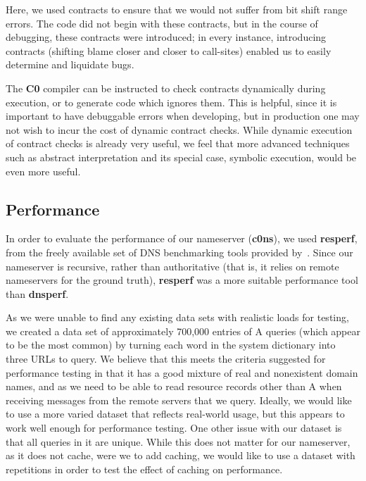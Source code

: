 \documentclass{article}
\newcommand\Kwd[1]{{\sffamily\bfseries{#1}}}
\begin{document}
Here, we used contracts to ensure that we would not suffer from bit
shift range errors. The code did not begin with these contracts, but
in the course of debugging, these contracts were introduced; in every
instance, introducing contracts (shifting blame closer and closer to
call-sites) enabled us to easily determine and liquidate bugs.

The \Kwd{C0} compiler can be instructed to check contracts dynamically
during execution, or to generate code which ignores them. This is
helpful, since it is important to have debuggable errors when
developing, but in production one may not wish to incur the cost of
dynamic contract checks. While dynamic execution of contract checks
is already very useful, we feel that more advanced techniques such as
abstract interpretation and its special case, symbolic execution,
would be even more useful.

\subsection{Performance}\label{sec:performance}

In order to evaluate the performance of our nameserver (\Kwd{c0ns}), we used \Kwd{resperf}, from the freely available set of DNS benchmarking tools provided by~\cite{github:dnsperf2}. Since our nameserver is recursive, rather than authoritative (that is, it relies on remote nameservers for the ground truth), \Kwd{resperf} was a more suitable performance tool than \Kwd{dnsperf}.

As we were unable to find any existing data sets with realistic loads for testing, we created a data set of approximately 700,000 entries of A queries (which appear to be the most common) by turning each word in the system dictionary into three URLs to query. We believe that this meets the criteria suggested for performance testing in that it has a good mixture of real and nonexistent domain names, and as we need to be able to read resource records other than A when receiving messages from the remote servers that we query. Ideally, we would like to use a more varied dataset that reflects real-world usage, but this appears to work well enough for performance testing. One other issue with our dataset is that all queries in it are unique. While this does not matter for our nameserver, as it does not cache, were we to add caching, we would like to use a dataset with repetitions in order to test the effect of caching on performance.
\end{document}
